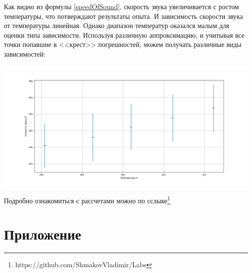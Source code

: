 \documentclass{article}
\begin{document}
Как видно из формулы \eqref{speedOfSound}, скорость звука увеличивается с ростом температуры, что потверждают результаты опыта. И зависимость скорости звука от температуры линейная. Однако диапазон температур оказался малым для оценки типа зависимости. Используя различную аппроксимацию, и учитывая все точки попавшие в <<крест>> погрешностей, можем получать различные виды зависимостей:
\begin{center}
    \includegraphics[scale = 0.25]{sppedByT.png}
\end{center}

Подробно ознакомиться с рассчетами можно по сслыке\footnote{https://github.com/ShmakovVladimir/Labs}
\section{Приложение}
\end{document}
